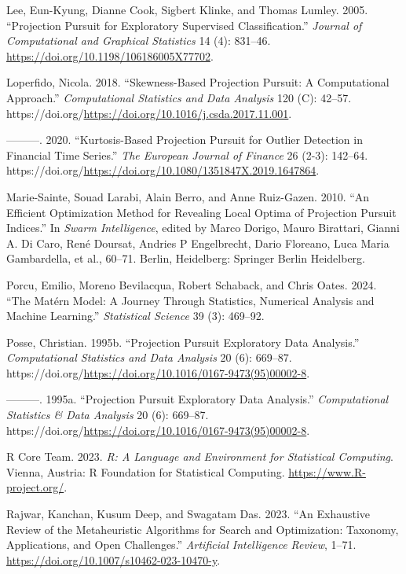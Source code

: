 \documentclass[
  12pt,
]{interact}
\newlength{\cslhangindent}
\newenvironment{CSLReferences}[2] %
 {\begin{list}{}{%
  \setlength{\itemindent}{0pt}
  \setlength{\leftmargin}{0pt}
  \setlength{\parsep}{0pt}
  \ifodd #1
   \setlength{\leftmargin}{\cslhangindent}
   \setlength{\itemindent}{-1\cslhangindent}
  \fi
  \setlength{\itemsep}{#2\baselineskip}}}
 {\end{list}}
\theoremstyle{plain}
\begin{document}
\begin{CSLReferences}{1}{0}
Lee, Eun-Kyung, Dianne Cook, Sigbert Klinke, and Thomas Lumley. 2005.
{``Projection Pursuit for Exploratory Supervised Classification.''}
\emph{Journal of Computational and Graphical Statistics} 14 (4):
831--46. \url{https://doi.org/10.1198/106186005X77702}.

Loperfido, Nicola. 2018. {``Skewness-Based Projection Pursuit: A
Computational Approach.''} \emph{Computational Statistics and Data
Analysis} 120 (C): 42--57.
https://doi.org/\url{https://doi.org/10.1016/j.csda.2017.11.001}.

---------. 2020. {``Kurtosis-Based Projection Pursuit for Outlier
Detection in Financial Time Series.''} \emph{The European Journal of
Finance} 26 (2-3): 142--64.
https://doi.org/\url{https://doi.org/10.1080/1351847X.2019.1647864}.

Marie-Sainte, Souad Larabi, Alain Berro, and Anne Ruiz-Gazen. 2010.
{``An Efficient Optimization Method for Revealing Local Optima of
Projection Pursuit Indices.''} In \emph{Swarm Intelligence}, edited by
Marco Dorigo, Mauro Birattari, Gianni A. Di Caro, René Doursat, Andries
P Engelbrecht, Dario Floreano, Luca Maria Gambardella, et al., 60--71.
Berlin, Heidelberg: Springer Berlin Heidelberg.

Porcu, Emilio, Moreno Bevilacqua, Robert Schaback, and Chris Oates.
2024. {``The {M}atérn Model: A Journey Through Statistics, Numerical
Analysis and Machine Learning.''} \emph{Statistical Science} 39 (3):
469--92.

Posse, Christian. 1995b. {``Projection Pursuit Exploratory Data
Analysis.''} \emph{Computational Statistics and Data Analysis} 20 (6):
669--87.
https://doi.org/\url{https://doi.org/10.1016/0167-9473(95)00002-8}.

---------. 1995a. {``Projection Pursuit Exploratory Data Analysis.''}
\emph{Computational Statistics \& Data Analysis} 20 (6): 669--87.
https://doi.org/\url{https://doi.org/10.1016/0167-9473(95)00002-8}.

R Core Team. 2023. \emph{R: A Language and Environment for Statistical
Computing}. Vienna, Austria: R Foundation for Statistical Computing.
\url{https://www.R-project.org/}.

Rajwar, Kanchan, Kusum Deep, and Swagatam Das. 2023. {``An Exhaustive
Review of the Metaheuristic Algorithms for Search and Optimization:
Taxonomy, Applications, and Open Challenges.''} \emph{Artificial
Intelligence Review}, 1--71.
\url{https://doi.org/10.1007/s10462-023-10470-y}.


\end{CSLReferences}
\end{document}
